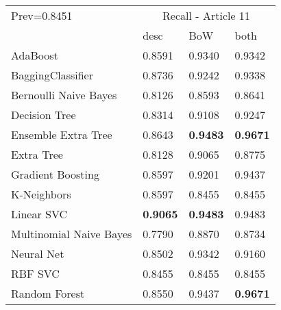 \begin{tabular}{|l|l|l|l| }
\hline
Prev=0.8451 &  \multicolumn{3}{c|}{Recall - Article 11} \\
\cline{2-4} & desc & BoW & both \\ \hline
AdaBoost                & 0.8591 & 0.9340 & 0.9342\\
BaggingClassifier       & 0.8736 & 0.9242 & 0.9338\\
Bernoulli Naive Bayes   & 0.8126 & 0.8593 & 0.8641\\
Decision Tree           & 0.8314 & 0.9108 & 0.9247\\
Ensemble Extra Tree     & 0.8643 & {\bf 0.9483} & {\bf 0.9671}\\
Extra Tree              & 0.8128 & 0.9065 & 0.8775\\
Gradient Boosting       & 0.8597 & 0.9201 & 0.9437\\
K-Neighbors             & 0.8597 & 0.8455 & 0.8455\\
Linear SVC              & {\bf 0.9065} & {\bf 0.9483} & 0.9483\\
Multinomial Naive Bayes & 0.7790 & 0.8870 & 0.8734\\
Neural Net              & 0.8502 & 0.9342 & 0.9160\\
RBF SVC                 & 0.8455 & 0.8455 & 0.8455\\
Random Forest           & 0.8550 & 0.9437 & {\bf 0.9671}\\
\hline
\end{tabular}